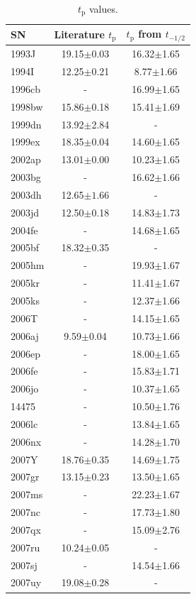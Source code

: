 \documentclass[a4paper,fleqn,usenatbib]{mnras}
\begin{document}
\begin{table}
 \centering
 \begin{minipage}{90mm}
  \caption{$t_{\mathrm{p}}$ values.}
 \begin{tabular}{lcc}
  \hline
SN & Literature $t_{\mathrm{p}}$ & $t_{\mathrm{p}}$ from $t_{-1/2}$ \\
\hline
1993J & 19.15$\pm$0.03 & 16.32$\pm$1.65 \\
1994I & 12.25$\pm$0.21 & 8.77$\pm$1.66 \\
1996cb & - &16.99$\pm$1.65 \\
1998bw & 15.86$\pm$0.18 & 15.41$\pm$1.69 \\
1999dn & 13.92$\pm$2.84 & - \\
1999ex & 18.35$\pm$0.04 & 14.60$\pm$1.65 \\
2002ap & 13.01$\pm$0.00 & 10.23$\pm$1.65 \\
2003bg & - &16.62$\pm$1.66 \\
2003dh & 12.65$\pm{1.66}$ & - \\
2003jd & 12.50$\pm$0.18 & 14.83$\pm$1.73 \\
2004fe & - &14.68$\pm$1.65 \\
2005bf & 18.32$\pm$0.35 & - \\
2005hm & - &19.93$\pm$1.67 \\
2005kr & - &11.41$\pm$1.67 \\
2005ks & - &12.37$\pm$1.66 \\
2006T & - &14.15$\pm$1.65 \\
2006aj & 9.59$\pm$0.04 & 10.73$\pm$1.66 \\
2006ep & - &18.00$\pm$1.65 \\
2006fe & - &15.83$\pm$1.71 \\
2006jo & - &10.37$\pm$1.65 \\
14475 & - &10.50$\pm$1.76 \\
2006lc & - &13.84$\pm$1.65 \\
2006nx & - &14.28$\pm$1.70 \\
2007Y & 18.76$\pm$0.35 & 14.69$\pm$1.75 \\
2007gr & 13.15$\pm$0.23 & 13.50$\pm$1.65 \\
2007ms & - &22.23$\pm$1.67 \\
2007nc & - &17.73$\pm$1.80 \\
2007qx & - &15.09$\pm$2.76 \\
2007ru & 10.24$\pm$0.05 & - \\
2007sj & - &14.54$\pm$1.66 \\
2007uy & 19.08$\pm$0.28 & - \\

\end{tabular}
\end{minipage}
\end{table}
\end{document}
